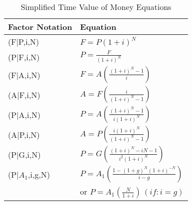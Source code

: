 \documentclass{article}
\begin{document}

\renewcommand{\arraystretch}{1.5}


\begin{table}
\caption{Simplified Time Value of Money Equations}
\centering
\begin{tabular}[htb]{l|l}
Factor Notation & Equation\\
\hline
(F|P,i,N) & $F=P(1+i)^N$\\
(P|F,i,N) & $P=\frac{F}{(1+i)^N}$\\
(F|A,i,N) & $F=A\left(\frac{(1+i)^{N}-1}{i}\right)$\\
\hline
(A|F,i,N) & $A=F\left(\frac{i}{(1+i)^{N}-1}\right)$\\
(P|A,i,N) & $P=A\left(\frac{(1+i)^{N}-1}{i(1+i)^{N}}\right)$\\
(A|P,i,N) & $A=P\left(\frac{i(1+i)^{N}}{(1+i)^{N}-1}\right)$\\
\hline
(P|G,i,N) &$P=G\left(\frac{(1+i)^{N}-iN-1}{i^{2}(1+i)^{N}}\right)$\\
\hline
(P|$A_1$,i,g,N) & $P=A_{1}\left(\frac{1-(1+g)^{N}(1+i)^{-N}}{i-g}\right)$ \\
 ~&  or $P=A_{1}\left(\frac{N}{1+i}\right)\,(if : i = g)$ \\


\end{tabular}
\end{table}
\end{document}
